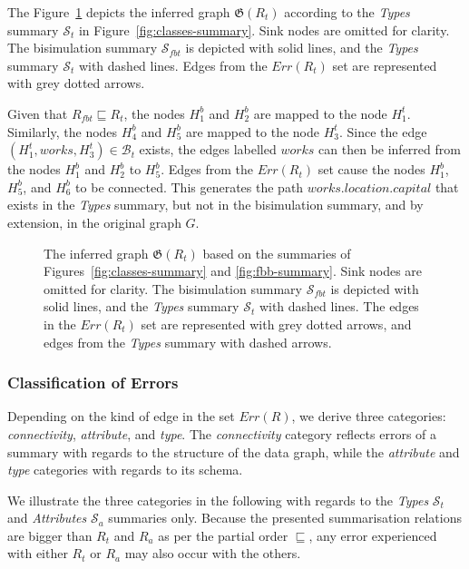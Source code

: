 The Figure~\ref{fig:accuracy} depicts the inferred graph $\mathfrak{G}(R_t)$ according to the \emph{Types} summary $\mathcal{S}_t$ in Figure~\ref{fig:classes-summary}.
Sink nodes are omitted for clarity. The bisimulation summary $\mathcal{S}_{fbt}$ is depicted with solid lines, and the \emph{Types} summary $\mathcal{S}_t$ with dashed lines. Edges from the $Err(R_t)$ set are represented with grey dotted arrows.

Given that $R_{fbt} \sqsubseteq R_t$, the nodes $H^b_1$ and $H^b_2$ are mapped to the node $H^t_1$. Similarly, the nodes $H^b_4$ and $H^b_5$ are mapped to the node $H^t_3$. Since the edge $(H^t_1, works, H^t_3) \in \mathcal{B}_t$ exists, the edges labelled $works$ can then be inferred from the nodes $H^b_1$ and $H^b_2$ to $H^b_5$. Edges from the $Err(R_t)$ set cause the nodes $H^b_1$, $H^b_5$, and $H^b_6$ to be connected. This generates the path $works.location.capital$ that exists in the \emph{Types} summary, but not in the bisimulation summary, and by extension, in the original graph $G$.

\begin{figure}
	\centering
	\resizebox{\textwidth}{!}{
		
	}
	\caption{The inferred graph $\mathfrak{G}(R_t)$ based on the summaries of Figures~\ref{fig:classes-summary} and \ref{fig:fbb-summary}.
	Sink nodes are omitted for clarity. The bisimulation summary $\mathcal{S}_{fbt}$ is depicted with solid lines, and the \emph{Types} summary $\mathcal{S}_t$ with dashed lines. The edges in the $Err(R_t)$ set are represented with grey dotted arrows, and edges from the \emph{Types} summary with dashed arrows.}
	\label{fig:accuracy}
\end{figure}

\subsubsection{Classification of Errors}

Depending on the kind of edge in the set $Err(R)$, we derive three categories: \emph{connectivity}, \emph{attribute}, and \emph{type}. The \emph{connectivity} category reflects errors of a summary with regards to the structure of the data graph, while the \emph{attribute} and \emph{type} categories with regards to its schema.

We illustrate the three categories in the following with regards to the \emph{Types} $\mathcal{S}_t$ and \emph{Attributes} $\mathcal{S}_a$ summaries only. Because the presented summarisation relations are bigger than $R_t$ and $R_a$ as per the partial order $\sqsubseteq$, any error experienced with either $R_t$ or $R_a$ may also occur with the others.

